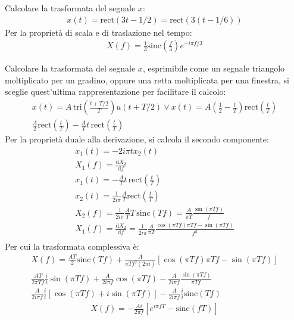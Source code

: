 \documentclass{article}
\newcommand{\rect}{\mbox{rect}}
\newcommand{\sinc}{\mbox{sinc}}
\newcommand{\df}{\mathrm{d}}
\begin{document}
Calcolare la trasformata del segnale $x$: 
\begin{gather*}
    x(t)=\rect(3t-1/2)=\rect(3(t-1/6))
\end{gather*}
Per la proprietà di scala e di traslazione nel tempo:
\begin{gather}
    X(f)=\displaystyle\frac{1}{3}\sinc\left(\frac{f}{3}\right)e^{-i\pi f/3}
\end{gather}


Calcolare la trasformata del segnale $x$, esprimibile come un segnale triangolo moltiplicato per un gradino, oppure una retta moltiplicata per una finestra, si sceglie 
quest'ultima rappresentazione per facilitare il calcolo:
\begin{gather*}
    x(t)=A\,\displaystyle\mbox{tri}\left(\frac{t+T/2}{T}\right)u(t+T/2)\lor x(t)=A\left(\frac{1}{2}-\frac{t}{T}\right)\rect\left(\frac{t}{T}\right)\\
    \displaystyle\frac{A}{2}\rect\left(\frac{t}{T}\right)-\frac{A}{T}t\,\rect\left(\frac{t}{T}\right)
\end{gather*}
Per la proprietà duale alla derivazione, si calcola il secondo componente: 
\begin{gather*}
    x_1(t)=-2i\pi tx_2(t)\\
    X_1(f)=\displaystyle\frac{\df X_2}{\df f}\\
    x_1(t)=-\displaystyle\frac{A}{T}t\,\rect\left(\frac{t}{T}\right)\\
    x_2(t)=\displaystyle\frac{1}{2i\pi}\frac{A}{T}\rect\left(\frac{t}{T}\right)\\
    X_2(f)=\displaystyle\frac{1}{2i\pi}\frac{A}{T}T\,\sinc(Tf)=\frac{A}{\pi T}\frac{\sin(\pi Tf)}{f}\\
    X_1(f)=\displaystyle\frac{\df X_2}{\df f}=\frac{1}{2i\pi}\frac{A}{\pi T}\frac{\cos(\pi Tf)\pi Tf-\sin(\pi Tf)}{f^2}\\
\end{gather*}
Per cui la trasformata complessiva è:
\begin{gather*}
    X(f)=\displaystyle\frac{AT}{2}\sinc(Tf)+\frac{A}{\pi Tf^2(2\pi i)}\left[\cos(\pi Tf)\pi Tf-\sin (\pi Tf)\right]\\
    \displaystyle\frac{AT}{2\pi Tf}\frac{i}{i}\sin(\pi Tf)+\frac{A}{2i\pi f}\cos(\pi Tf)-\frac{A}{2i\pi f}\frac{\sin(\pi Tf)}{\pi Tf}\\
    \displaystyle\frac{A}{2i\pi f}\frac{i}{i}\left[\cos(\pi Tf)+i\sin(\pi Tf)\right]-\frac{A}{2i\pi f}\frac{i}{i}\sinc( Tf)
\end{gather*}
\begin{gather}
    X(f)=\displaystyle-\frac{Ai}{2\pi f}\left[e^{i\pi fT}-\sinc(fT)\right]
\end{gather}
\end{document}
